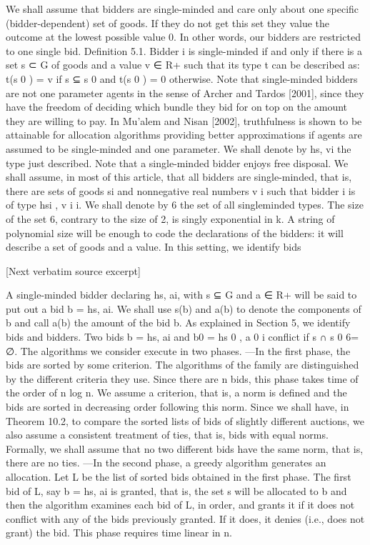 \documentclass[10pt]{article}
\begin{document}
\begin{ReviewVerbatim}
We shall assume that bidders are single-minded and care only about one specific
(bidder-dependent) set of goods. If they do not get this set they value the outcome
at the lowest possible value 0. In other words, our bidders are restricted to one
single bid.
Definition 5.1. Bidder i is single-minded if and only if there is a set s ⊂ G of
goods and a value v ∈ R+ such that its type t can be described as: t(s 0 ) = v if s ⊆ s 0
and t(s 0 ) = 0 otherwise.
Note that single-minded bidders are not one parameter agents in the sense
of Archer and Tardos [2001], since they have the freedom of deciding which bundle
they bid for on top on the amount they are willing to pay. In Mu’alem and Nisan
[2002], truthfulness is shown to be attainable for allocation algorithms providing
better approximations if agents are assumed to be single-minded and one parameter. We shall denote by hs, vi the type just described. Note that a single-minded
bidder enjoys free disposal. We shall assume, in most of this article, that all bidders
are single-minded, that is, there are sets of goods si and nonnegative real numbers
v i such that bidder i is of type hsi , v i i. We shall denote by 6 the set of all singleminded types. The size of the set 6, contrary to the size of 2, is singly exponential
in k. A string of polynomial size will be enough to code the declarations of the
bidders: it will describe a set of goods and a value. In this setting, we identify bids

[Next verbatim source excerpt]

A single-minded bidder declaring hs, ai, with s ⊆ G and a ∈ R+ will be said to
put out a bid b = hs, ai. We shall use s(b) and a(b) to denote the components of b
and call a(b) the amount of the bid b. As explained in Section 5, we identify bids
and bidders. Two bids b = hs, ai and b0 = hs 0 , a 0 i conflict if s ∩ s 0 6= ∅.
The algorithms we consider execute in two phases.
—In the first phase, the bids are sorted by some criterion. The algorithms of the
family are distinguished by the different criteria they use. Since there are n bids,
this phase takes time of the order of n log n. We assume a criterion, that is, a norm
is defined and the bids are sorted in decreasing order following this norm. Since
we shall have, in Theorem 10.2, to compare the sorted lists of bids of slightly
different auctions, we also assume a consistent treatment of ties, that is, bids
with equal norms. Formally, we shall assume that no two different bids have the
same norm, that is, there are no ties.
—In the second phase, a greedy algorithm generates an allocation. Let L be the
list of sorted bids obtained in the first phase. The first bid of L, say b = hs, ai is
granted, that is, the set s will be allocated to b and then the algorithm examines
each bid of L, in order, and grants it if it does not conflict with any of the bids
previously granted. If it does, it denies (i.e., does not grant) the bid. This phase
requires time linear in n.


\end{ReviewVerbatim}
\end{document}
